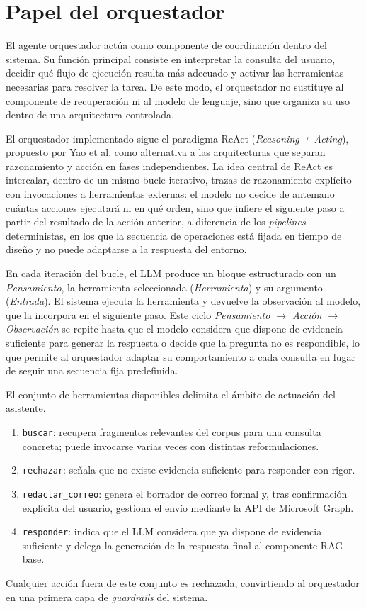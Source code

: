\section{Papel del orquestador}\label{sec:papel-orquestador}

El agente orquestador actúa como componente de coordinación dentro del sistema. 
Su función principal consiste en interpretar la consulta del usuario, decidir qué flujo de ejecución resulta más adecuado y activar las herramientas necesarias para resolver la tarea. 
De este modo, el orquestador no sustituye al componente de recuperación ni al modelo de lenguaje, sino que organiza su uso dentro de una arquitectura controlada.

El orquestador implementado sigue el paradigma ReAct \cite{yao2023react} (\textit{Reasoning + Acting}), propuesto por Yao et al. como alternativa a las arquitecturas que separan razonamiento y acción en fases independientes. 
La idea central de ReAct es intercalar, dentro de un mismo bucle iterativo, trazas de razonamiento explícito con invocaciones a herramientas externas: el modelo no decide de antemano cuántas acciones ejecutará ni en qué orden, sino que infiere el siguiente paso a partir del resultado de la acción anterior, a diferencia de los \textit{pipelines} deterministas, en los que la secuencia de operaciones está fijada en tiempo de diseño y no puede adaptarse a la respuesta del entorno.

En cada iteración del bucle, el LLM produce un bloque estructurado con un \textit{Pensamiento}, la herramienta seleccionada (\textit{Herramienta}) y su argumento (\textit{Entrada}).
El sistema ejecuta la herramienta y devuelve la observación al modelo, que la incorpora en el siguiente paso.
Este ciclo \textit{Pensamiento $\to$ Acción $\to$ Observación} se repite hasta que el modelo considera que dispone de evidencia suficiente para generar la respuesta o decide que la pregunta no es respondible, lo que permite al orquestador adaptar su comportamiento a cada consulta en lugar de seguir una secuencia fija predefinida.

El conjunto de herramientas disponibles delimita el ámbito de actuación del asistente.
\begin{enumerate}
    \item \texttt{buscar}: recupera fragmentos relevantes del corpus para una consulta concreta; puede invocarse varias veces con distintas reformulaciones.
    \item \texttt{rechazar}: señala que no existe evidencia suficiente para responder con rigor.
    \item \texttt{redactar\_correo}: genera el borrador de correo formal y, tras confirmación explícita del usuario, gestiona el envío mediante la API de Microsoft Graph.
    \item \texttt{responder}: indica que el LLM considera que ya dispone de evidencia suficiente y delega la generación de la respuesta final al componente RAG base.
\end{enumerate}
Cualquier acción fuera de este conjunto es rechazada, convirtiendo al orquestador en una primera capa de \textit{guardrails} del sistema.


